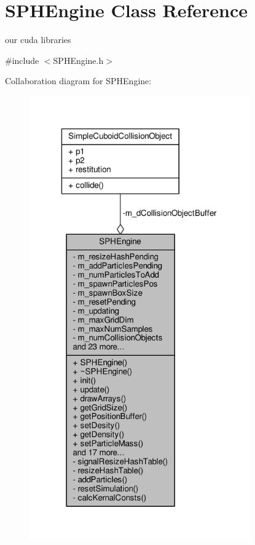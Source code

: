 \hypertarget{class_s_p_h_engine}{\section{S\-P\-H\-Engine Class Reference}
\label{class_s_p_h_engine}
}


our cuda libraries  




{\ttfamily \#include $<$S\-P\-H\-Engine.\-h$>$}



Collaboration diagram for S\-P\-H\-Engine\-:\nopagebreak
\begin{figure}[H]
\begin{center}
\leavevmode
\includegraphics[width=269pt]{class_s_p_h_engine__coll__graph}
\end{center}
\end{figure}
